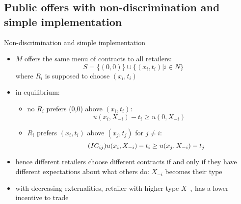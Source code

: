\documentclass[11pt,english]{beamer}
\begin{document}
\subsection{Public offers with non-discrimination and simple implementation}

\begin{frame}[allowframebreaks]{Non-discrimination and simple implementation}
  \begin{itemize}
  \item $M$ offers the same menu of contracts to all retailers:
    \begin{equation}
      \label{eq:S03aMenuS}
      S=\{(0,0)\} \cup \{(x_i,t_i)|i \in N\}
    \end{equation}
    where $R_i$ is supposed to choose $(x_i,t_i)$
  \item in equilibrium:
    \begin{itemize}
    \item no $R_i$ prefers (0,0) above $(x_i,t_i)$:
      \begin{equation}
        \tag{$IR_i$}
        u(x_i,X_{-i})-t_i \geq u(0,X_{-i})
      \end{equation}
    \item $R_i$ prefers $(x_i,t_i)$ above $(x_j,t_j)$ for $j \neq i$:
      \begin{equation}
        \tag{$IC_{ij}$}
        u(x_i,X_{-i})-t_i \geq u(x_j,X_{-i})-t_j
      \end{equation}
    \end{itemize}
  \item hence different retailers choose different contracts if and
    only if they have different expectations about what others do:
    $X_{-i}$ becomes their type
  \item with decreasing externalities, retailer with higher type
    $X_{-i}$ has a lower incentive to trade
  \end{itemize}
\end{frame}
\end{document}
